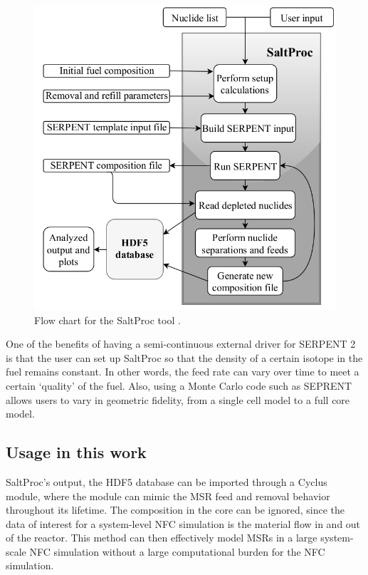 \begin{figure}[htbp!]
	\begin{center}
		\includegraphics[scale=0.3]{./images/saltproc.png}
	\end{center}
	\caption{Flow chart for the SaltProc tool
		\cite{rykhlevskii_online_2017}.}
	\label{fig:SaltProc}
\end{figure}


One of the benefits of having a semi-continuous external driver for
SERPENT 2 is that the user can set up SaltProc so that the density
of a certain isotope in the fuel remains constant. In other words,
the feed rate can vary over time to meet a certain `quality' of the fuel.
Also, using a Monte Carlo code such as SEPRENT allows users to vary
in geometric fidelity, from a single cell model to a full core model.

\subsection{Usage in this work}
SaltProc's output, the HDF5 database can be imported through a Cyclus
module, where the module can mimic the \gls{MSR} feed and removal
behavior throughout its lifetime. The composition in the core can
be ignored, since the data of interest for a system-level \gls{NFC} simulation
is the material flow in and out of the reactor. This method can
then effectively model \glspl{MSR} in a large system-scale \gls{NFC}
simulation without a large computational burden for the \gls{NFC} simulation.